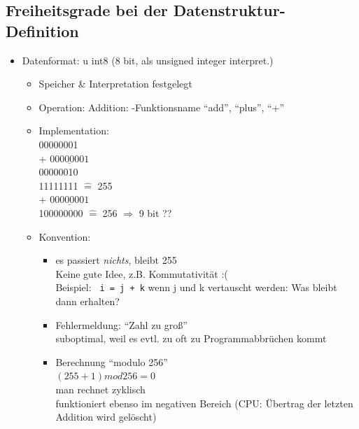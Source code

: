\subsection*{Freiheitsgrade bei der Datenstruktur-Definition}

\begin{itemize}[label={$\bullet$}]
    \item Datenformat: u int8 (8 bit, als unsigned integer interpret.)
    \begin{itemize}[label={-}]
        \item Speicher \& Interpretation festgelegt
        \item Operation: Addition: -Funktionsname ``add'', ``plus'', ``+''
        \item Implementation:  \\
        \hspace*{0.5cm}00000001 \\
        \hspace*{0.05cm} + $\underline{ 00000001}$ \\
        \hspace*{0.5cm}00000010\\

        \hspace*{0.5cm}11111111 $\widehat{=}$ 255 \\
        \hspace*{0.05cm} + $\underline{00000001}$ \\
        \hspace*{0.25cm} 100000000 $\widehat{=}$ 256 $\Rightarrow$ 9 bit ?? \\

        \item Konvention:
        \begin{itemize}[label={-}]
            \item es passiert \emph{nichts}, bleibt 255 \\
            Keine gute Idee, z.B. Kommutativität :( \\
            Beispiel: \verb| i = j + k| wenn j und k vertauscht werden: Was bleibt dann erhalten?
            \item Fehlermeldung: ``Zahl zu groß'' \\
            suboptimal, weil es evtl. zu oft zu Programmabbrüchen kommt
            \item Berechnung ``modulo 256'' \\
            $(255+1)mod256 = 0$ \\
            man rechnet zyklisch \\
            funktioniert ebenso im negativen Bereich
            (CPU: Übertrag der letzten Addition wird gelöscht)
        \end{itemize}
    \end{itemize}
\end{itemize}


